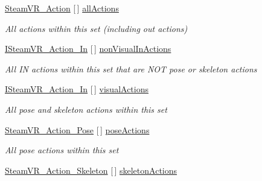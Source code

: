 \begin{DoxyCompactItemize}
\item 
\mbox{\hyperlink{class_valve_1_1_v_r_1_1_steam_v_r___action}{Steam\+V\+R\+\_\+\+Action}} \mbox{[}$\,$\mbox{]} \mbox{\hyperlink{class_valve_1_1_v_r_1_1_steam_v_r___action_set_adc8074b2043ebd3ccf470aef4f02c1d3}{all\+Actions}}
\begin{DoxyCompactList}\small\item\em All actions within this set (including out actions) \end{DoxyCompactList}\item 
\mbox{\hyperlink{interface_valve_1_1_v_r_1_1_i_steam_v_r___action___in}{I\+Steam\+V\+R\+\_\+\+Action\+\_\+\+In}} \mbox{[}$\,$\mbox{]} \mbox{\hyperlink{class_valve_1_1_v_r_1_1_steam_v_r___action_set_ac0c94124b2bccf8f0af077de0191e000}{non\+Visual\+In\+Actions}}
\begin{DoxyCompactList}\small\item\em All IN actions within this set that are N\+OT pose or skeleton actions \end{DoxyCompactList}\item 
\mbox{\hyperlink{interface_valve_1_1_v_r_1_1_i_steam_v_r___action___in}{I\+Steam\+V\+R\+\_\+\+Action\+\_\+\+In}} \mbox{[}$\,$\mbox{]} \mbox{\hyperlink{class_valve_1_1_v_r_1_1_steam_v_r___action_set_a89d6139bb48360e1b3c1622747c3a384}{visual\+Actions}}
\begin{DoxyCompactList}\small\item\em All pose and skeleton actions within this set \end{DoxyCompactList}\item 
\mbox{\hyperlink{class_valve_1_1_v_r_1_1_steam_v_r___action___pose}{Steam\+V\+R\+\_\+\+Action\+\_\+\+Pose}} \mbox{[}$\,$\mbox{]} \mbox{\hyperlink{class_valve_1_1_v_r_1_1_steam_v_r___action_set_ae523ca47e6a064f396bcebb6f50d7e75}{pose\+Actions}}
\begin{DoxyCompactList}\small\item\em All pose actions within this set \end{DoxyCompactList}\item 
\mbox{\hyperlink{class_valve_1_1_v_r_1_1_steam_v_r___action___skeleton}{Steam\+V\+R\+\_\+\+Action\+\_\+\+Skeleton}} \mbox{[}$\,$\mbox{]} \mbox{\hyperlink{class_valve_1_1_v_r_1_1_steam_v_r___action_set_aeed444513c7a235df879f703e4a6227e}{skeleton\+Actions}}

\end{DoxyCompactItemize}
